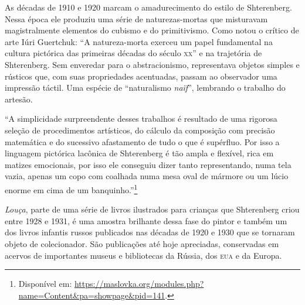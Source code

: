 \documentclass[11pt]{extarticle}
\begin{document}
As décadas de 1910 e 1920 marcam o amadurecimento do estilo de Shterenberg. Nessa época ele produziu uma série de naturezas-mortas que misturavam magistralmente elementos do cubismo e do primitivismo. Como notou o crítico de arte Iúri Guertchuk: “A natureza-morta exerceu um papel fundamental na cultura pictórica das primeiras décadas do século \textsc{xx}” e na trajetória de Shterenberg. Sem enveredar para o abstracionismo, representava objetos simples e rústicos que, com suas propriedades acentuadas, passam ao observador uma impressão táctil. Uma espécie de “naturalismo \textit{naïf}”, lembrando o trabalho do artesão. 

“A simplicidade surpreendente desses trabalhos é resultado de uma rigorosa seleção de procedimentos artísticos, do cálculo da composição com precisão matemática e do sucessivo afastamento de tudo o que é supérfluo. Por isso a linguagem pictórica lacônica de Shterenberg é tão ampla e flexível, rica em matizes emocionais, por isso ele conseguiu dizer tanto representando, numa tela vazia, apenas um copo com coalhada numa mesa oval de mármore ou um lúcio enorme em cima de um banquinho.”\footnote{Disponível em: \url{https://maslovka.org/modules.php?name=Content&pa=showpage&pid=141}.} 


\textit{Louça}, parte de uma série de livros ilustrados para crianças que Shterenberg criou entre 1928 e 1931, é uma amostra brilhante dessa fase do pintor e também um dos livros infantis russos publicados nas décadas de 1920 e 1930 que se tornaram objeto de colecionador. São publicações até hoje apreciadas, conservadas em acervos de importantes museus e bibliotecas da Rússia, dos \textsc{eua} e da Europa.
\end{document}
